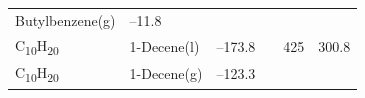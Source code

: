 \documentclass[
]{book}
\theoremstyle{definition}
\theoremstyle{definition}
\theoremstyle{definition}
\theoremstyle{remark}
\begin{document}
\begin{longtable}[]{@{}llllll@{}}
\begin{minipage}[t]{0.17\columnwidth}
Butylbenzene(g)\strut
\end{minipage} & \begin{minipage}[t]{0.15\columnwidth}\raggedright
--11.8\strut
\end{minipage} & \begin{minipage}[t]{0.15\columnwidth}\raggedright
\strut
\end{minipage} & \begin{minipage}[t]{0.14\columnwidth}\raggedright
\strut
\end{minipage} & \begin{minipage}[t]{0.14\columnwidth}\raggedright
\strut
\end{minipage}\tabularnewline
\begin{minipage}[t]{0.07\columnwidth}\raggedright
C\textsubscript{10}H\textsubscript{20}\strut
\end{minipage} & \begin{minipage}[t]{0.17\columnwidth}\raggedright
1-Decene(l)\strut
\end{minipage} & \begin{minipage}[t]{0.15\columnwidth}\raggedright
--173.8\strut
\end{minipage} & \begin{minipage}[t]{0.15\columnwidth}\raggedright
\strut
\end{minipage} & \begin{minipage}[t]{0.14\columnwidth}\raggedright
425\strut
\end{minipage} & \begin{minipage}[t]{0.14\columnwidth}\raggedright
300.8\strut
\end{minipage}\tabularnewline
\begin{minipage}[t]{0.07\columnwidth}\raggedright
C\textsubscript{10}H\textsubscript{20}\strut
\end{minipage} & \begin{minipage}[t]{0.17\columnwidth}\raggedright
1-Decene(g)\strut
\end{minipage} & \begin{minipage}[t]{0.15\columnwidth}\raggedright
--123.3\strut
\end{minipage} & \begin{minipage}[t]{0.15\columnwidth}\raggedright
\strut
\end{minipage} & \begin{minipage}[t]{0.14\columnwidth}\raggedright
\strut
\end{minipage} & \begin{minipage}[t]{0.14\columnwidth}\raggedright

\end{minipage}
\end{longtable}
\end{document}

